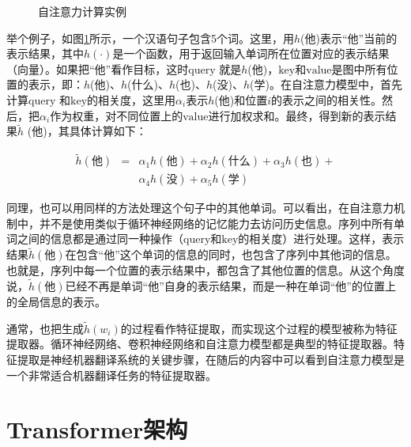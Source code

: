 \begin{figure}[htp]
\centering

\caption{自注意力计算实例}
\label{fig:12-3}
\end{figure}

\parinterval 举个例子，如图\ref{fig:12-3}所示，一个汉语句子包含5个词。这里，用$h$(他)表示“他”当前的表示结果，其中$h(\cdot)$是一个函数，用于返回输入单词所在位置对应的表示结果（向量）。如果把“他”看作目标，这时$\mathrm{query}$ 就是$h$(他)，$\mathrm{key}$和$\mathrm{value}$是图中所有位置的表示，即：{$h$(他)、$h$(什么)、$h$(也)、$h$(没)、$h$(学)}。在自注意力模型中，首先计算$\mathrm{query}$ 和$\mathrm{key}$的相关度，这里用$\alpha_i$表示$h$(他)和位置$i$的表示之间的相关性。然后，把$\alpha_i$作为权重，对不同位置上的$\mathrm{value}$进行加权求和。最终，得到新的表示结果$\tilde{h}$ (他)，其具体计算如下：

\begin{eqnarray}
\tilde{h} (\textrm{他} ) & = & \alpha_1 {h} (\textrm{他} ) + \alpha_2 {h} (\textrm{什么}) + \alpha_3 {h} (\textrm{也} ) + \nonumber \\
                         &   & \alpha_4 {h} (\textrm{没} ) +\alpha_5 {h} (\textrm{学} )
\label{eq:12-2}
\end{eqnarray}


\parinterval 同理，也可以用同样的方法处理这个句子中的其他单词。可以看出，在自注意力机制中，并不是使用类似于循环神经网络的记忆能力去访问历史信息。序列中所有单词之间的信息都是通过同一种操作（$\mathrm{query}$和$\mathrm{key}$的相关度）进行处理。这样，表示结果$\tilde{h} (\textrm{他})$在包含“他”这个单词的信息的同时，也包含了序列中其他词的信息。也就是，序列中每一个位置的表示结果中，都包含了其他位置的信息。从这个角度说，$\tilde{h} (\textrm{他})$已经不再是单词“他”自身的表示结果，而是一种在单词“他”的位置上的全局信息的表示。

\parinterval 通常，也把生成$\tilde{h}(w_i)$的过程看作特征提取，而实现这个过程的模型被称为特征提取器。循环神经网络、卷积神经网络和自注意力模型都是典型的特征提取器。特征提取是神经机器翻译系统的关键步骤，在随后的内容中可以看到自注意力模型是一个非常适合机器翻译任务的特征提取器。

\sectionnewpage
\section{Transformer架构}

